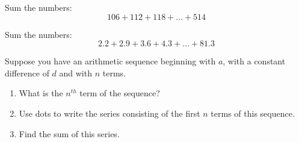 \documentclass{ximera}
\begin{document}
\begin{problem}
Sum the numbers:  
\[
106 + 112 + 118 + \dots + 514
\]
\end{problem}

\begin{problem}
Sum the numbers:
\[
2.2 + 2.9 + 3.6 + 4.3 + \dots + 81.3
\]
\end{problem}


\begin{problem}
Suppose you have an arithmetic sequence beginning with $a$, with a constant difference of $d$ and with $n$ terms.  
\begin{enumerate}
\item What is the $n^{th}$ term of the sequence?  
\item Use dots to write the series consisting of the first $n$ terms of this sequence.
\item Find the sum of this series.  
\end{enumerate}
\end{problem}
\end{document}
